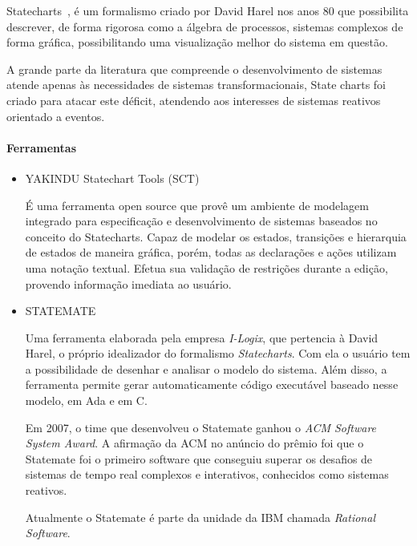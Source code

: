 Statecharts~\cite{Harel:1987:SVF:34884.34886}, é um formalismo criado por
David Harel nos anos 80 que possibilita descrever, de forma rigorosa como a
álgebra de processos, sistemas complexos de forma gráfica, possibilitando uma
visualização melhor do sistema em questão.

A grande parte da literatura que compreende o desenvolvimento de sistemas atende
apenas às necessidades de sistemas transformacionais, State charts foi criado para
atacar este déficit, atendendo aos interesses de sistemas reativos orientado a eventos.

\paragraph{Ferramentas}
\begin{itemize}

\item{YAKINDU Statechart Tools (SCT)}

É uma ferramenta open source que provê um ambiente de modelagem integrado para especificação e
desenvolvimento de sistemas baseados no conceito do Statecharts. Capaz de modelar os estados, transições
e hierarquia de estados de maneira gráfica, porém, todas as declarações e ações utilizam uma notação
textual. Efetua sua validação de restrições durante a edição, provendo informação imediata ao usuário.


\item{STATEMATE}

Uma ferramenta elaborada pela empresa \textit{I-Logix}, que pertencia à David Harel, o próprio
idealizador do formalismo \textit{Statecharts}. Com ela o usuário tem a possibilidade de desenhar
e analisar o modelo do sistema. Além disso, a ferramenta permite gerar automaticamente
código executável baseado nesse modelo, em Ada e em C.

Em 2007, o time que desenvolveu o Statemate ganhou o \textit{ACM Software System Award}. A afirmação
da ACM no anúncio do prêmio foi que o Statemate foi o primeiro software que conseguiu superar os
desafios de sistemas de tempo real complexos e interativos, conhecidos como sistemas reativos.

Atualmente o Statemate é parte da unidade da IBM chamada \textit{Rational Software}.

\end{itemize}
